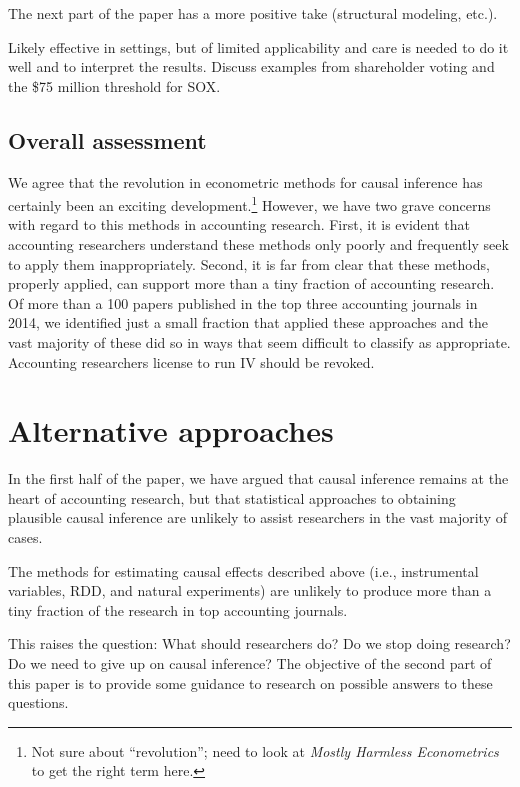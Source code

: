 \documentclass[11pt]{amsart}
\begin{document}
The next part of the paper has a more positive take (structural modeling, etc.).

Likely effective in settings, but of limited applicability and care is needed to do it well and to interpret the results. Discuss examples from shareholder voting and the \$75 million threshold for SOX.

\subsection{Overall assessment}

We agree that the revolution in econometric methods for causal inference has certainly been an exciting development.\footnote{Not sure about ``revolution''; need to look at \emph{Mostly Harmless Econometrics} to get the right term here.} However, we have two grave concerns with regard to this methods in accounting research. First, it is evident that accounting researchers understand these methods only poorly and frequently seek to apply them inappropriately. Second,  it is far from clear that these methods, properly applied, can support more than a tiny fraction of accounting research. Of more than a 100 papers published in the top three accounting journals in 2014, we identified just a small fraction that applied these approaches and the vast majority of these did so in ways that seem difficult to classify as appropriate. Accounting researchers license to run IV should be revoked.

\section{Alternative approaches}

In the first half of the paper, we have argued that causal inference remains at the heart of accounting research, but that statistical approaches to obtaining plausible causal inference are unlikely to assist researchers in the vast majority of cases.

The methods for estimating causal effects described above (i.e., instrumental variables, RDD, and natural experiments) are unlikely to produce more than a tiny fraction of the research in top accounting journals.

This raises the question: What should researchers do? Do we stop doing research? Do we need to give up on causal inference? The objective of the second part of this paper is to provide some guidance to research on possible answers to these questions.
\end{document}
